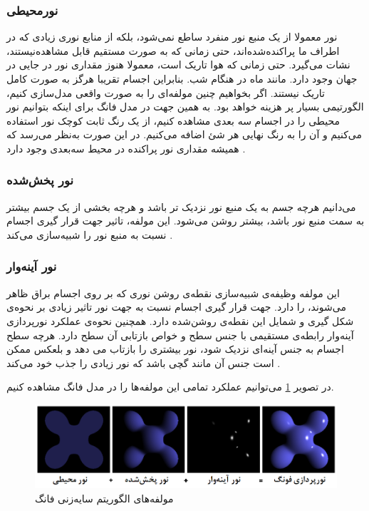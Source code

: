 \subsubsection{نورمحیطی}

نور معمولا از یک منبع نور منفرد ساطع نمی‌شود، بلکه
از منابع نوری زیادی که در اطراف ما پراکنده‌شده‌اند،
حتی زمانی که به صورت مستقیم قابل مشاهده‌نیستند،
نشات می‌گیرد.
حتی زمانی که هوا تاریک است، معمولا هنوز مقداری 
نور در جایی در جهان وجود دارد.
مانند ماه در هنگام شب.
بنابراین اجسام تقریبا هرگز به صورت کامل 
تاریک نیستند.
اگر بخواهیم چنین مولفه‌ای را به صورت واقعی مدل‌سازی کنیم، 
الگورتیمی بسیار پر هزینه خواهد بود.
به همین جهت در مدل فانگ برای اینکه بتوانیم نور محیطی را 
در اجسام سه بعدی مشاهده کنیم، 
از یک رنگ ثابت کوچک نور استفاده می‌کنیم و آن را به 
رنگ نهایی هر شئ اضافه می‌کنیم.
در این صورت به‌نظر می‌رسد که همیشه مقداری نور پراکنده در محیط 
سه‌بعدی وجود دارد \cite{LearnOpenGLPhongShading}.

\subsubsection{نور پخش‌شده}

می‌دانیم هرچه جسم به یک منبع نور نزدیک تر باشد و هرچه 
بخشی از یک جسم بیشتر به سمت منبع نور باشد، بیشتر روشن می‌شود.
این مولفه، تاثیر جهت قرار گیری 
اجسام نسبت به منبع نور را شبیه‌سازی می‌کند \cite{LearnOpenGLPhongShading}.

\subsubsection{نور آینه‌وار}

این مولفه وظیفه‌ی شبیه‌سازی نقطه‌ی روشن نوری که 
بر روی اجسام براق ظاهر می‌شوند، را دارد.
جهت قرار گیری اجسام نسبت به جهت نور 
تاثیر زیادی بر نحوه‌ی شکل گیری و شمایل این 
نقطه‌ی روشن‌شده دارد.
همچنین نحوه‌ی عملکرد نورپردازی آینه‌وار رابطه‌ی مستقیمی با 
 جنس سطح و خواص بازتابی آن سطح دارد.
هرچه سطح اجسام به جنس آینه‌ای نزدیک شود، نور بیشتری را بازتاب می دهد 
و بلعکس ممکن است جنس آن مانند گچی باشد که نور زیادی را جذب خود می‌کند \cite{LearnOpenGLPhongShading}.

در تصویر 
\ref{fig:PhongShadingWikipedia}
می‌توانیم عملکرد تمامی این مولفه‌ها را در مدل فانگ مشاهده کنیم.

\begin{figure}[ht]
	\centerline{\includegraphics[width=\textwidth,height=\textheight,keepaspectratio]{Figures/Ch2/Phong_components.png}}

	\caption{مولفه‌های الگوریتم سایه‌زنی فانگ
    \cite{PhongShadingWikipedia}
    }
	\label{fig:PhongShadingWikipedia}
\end{figure}
